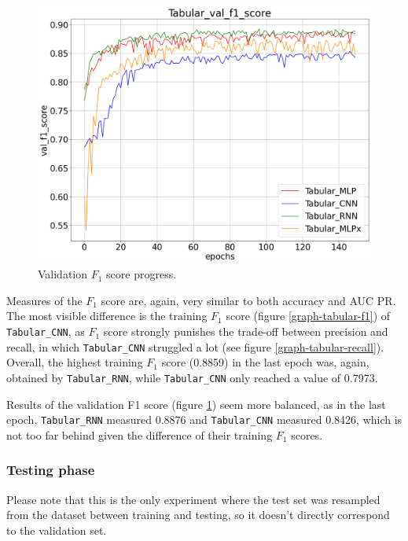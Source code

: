 \begin{figure}[!ht]
\begin{minipage}{0.48\textwidth}
        \includegraphics[width=\linewidth]{obrazky-figures/Tabular_experiment/val_f1_score_2023-03-23_15:04:46.png}
        \caption{Validation $F_1$ score progress.}
        \label{graph-tabular-val_f1}
    \end{minipage}
\end{figure}
Measures of the $F_1$ score are, again, very similar to both accuracy and AUC PR. The most visible difference is the
training $F_1$ score (figure \ref{graph-tabular-f1}) of \texttt{Tabular\_CNN}, as $F_1$ score strongly punishes the trade-off between
precision and recall, in which \texttt{Tabular\_CNN} struggled a lot (see figure \ref{graph-tabular-recall}).
Overall, the highest training $F_1$ score (0.8859) in the last epoch was, again, obtained by \texttt{Tabular\_RNN}, while
\texttt{Tabular\_CNN} only reached a value of 0.7973.

Results of the validation F1 score (figure \ref{graph-tabular-val_f1}) seem more balanced, as in the last epoch,
\texttt{Tabular\_RNN} measured 0.8876 and \texttt{Tabular\_CNN} measured 0.8426, which is not too far behind
given the difference of their training $F_1$ scores.


\subsubsection{Testing phase}
Please note that this is the only experiment where the test set was resampled from the dataset between training
and testing, so it doesn't directly correspond to the validation set.

